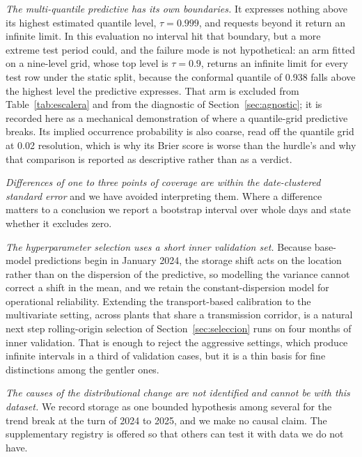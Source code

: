 \documentclass[preprint,3p,times]{elsarticle}
\providecommand{\DIFaddtex}[1]{{\protect\color{blue} \sf #1}} %
\providecommand{\DIFdeltex}[1]{{\protect\color{red} \scriptsize #1}} %
\providecommand{\DIFaddbegin}{} %
\providecommand{\DIFaddend}{} %
\providecommand{\DIFdelbegin}{} %
\providecommand{\DIFdelend}{} %
\providecommand{\DIFadd}[1]{\texorpdfstring{\DIFaddtex{#1}}{#1}} %
\providecommand{\DIFdel}[1]{\texorpdfstring{\DIFdeltex{#1}}{}} %
\begin{document}
\DIFadd{\emph{The multi-quantile predictive has its own boundaries.} It expresses nothing above its highest estimated quantile level, $\tau=0.999$, and requests beyond it return an infinite limit. In this evaluation no interval hit that boundary, but a more extreme test period could, and the failure mode is not hypothetical: an arm fitted on a nine-level grid, whose top level is $\tau=0.9$, returns an infinite limit for every test row under the static split, because the conformal quantile of 0.938 falls above the highest level the predictive expresses. That arm is excluded from Table~\ref{tab:escalera} and from the diagnostic of Section~\ref{sec:agnostic}; it is recorded here as a mechanical demonstration of where a quantile-grid predictive breaks. Its implied occurrence probability is also coarse, read off the quantile grid at 0.02 resolution, which is why its Brier score is worse than the hurdle's and why that comparison is reported as descriptive rather than as a verdict.
}

\DIFadd{\emph{Differences of one to three points of coverage are within the date-clustered standard error} and we have avoided interpreting them. Where a difference matters to a conclusion we report a bootstrap interval over whole days and state whether it excludes zero.
}

\DIFadd{\emph{The hyperparameter selection uses a short inner validation set.} Because base-model predictions begin in January 2024, }\DIFaddend the \DIFdelbegin \DIFdel{storage shift acts on the location rather than on the dispersion of the predictive, so modelling the variance cannot correct a shift in the mean, and we retain the constant-dispersion model for operational reliability. Extending the transport-based calibration to the multivariate setting, across plants that share a transmission corridor, is a natural next step}\DIFdelend \DIFaddbegin \DIFadd{rolling-origin selection of Section~\ref{sec:seleccion} runs on four months of inner validation. That is enough to reject the aggressive settings, which produce infinite intervals in a third of validation cases, but it is a thin basis for fine distinctions among the gentler ones}\DIFaddend .

\DIFaddbegin \DIFadd{\emph{The causes of the distributional change are not identified and cannot be with this dataset.} We record storage as one bounded hypothesis among several for the trend break at the turn of 2024 to 2025, and we make no causal claim. The supplementary registry is offered so that others can test it with data we do not have.
}
\end{document}
